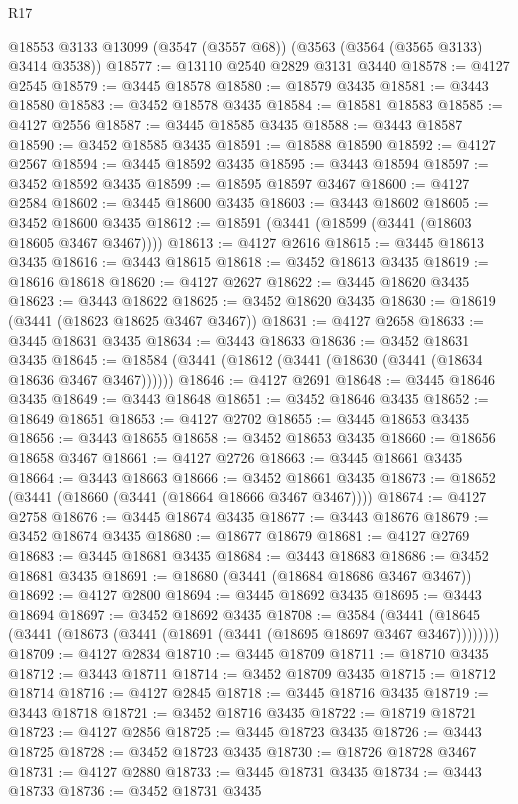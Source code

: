 \begin{lexlean}{R17}
\begin{coremodule}
    @18553
    @3133
    @13099
    (@3547 (@3557 @68))
    (@3563 (@3564 (@3565 @3133) @3414 @3538))
@18577 := @13110 @2540 @2829 @3131 @3440
@18578 := @4127 @2545
@18579 := @3445 @18578
@18580 := @18579 @3435
@18581 := @3443 @18580
@18583 := @3452 @18578 @3435
@18584 := @18581 @18583
@18585 := @4127 @2556
@18587 := @3445 @18585 @3435
@18588 := @3443 @18587
@18590 := @3452 @18585 @3435
@18591 := @18588 @18590
@18592 := @4127 @2567
@18594 := @3445 @18592 @3435
@18595 := @3443 @18594
@18597 := @3452 @18592 @3435
@18599 := @18595 @18597 @3467
@18600 := @4127 @2584
@18602 := @3445 @18600 @3435
@18603 := @3443 @18602
@18605 := @3452 @18600 @3435
@18612 := @18591 (@3441 (@18599 (@3441 (@18603 @18605 @3467 @3467))))
@18613 := @4127 @2616
@18615 := @3445 @18613 @3435
@18616 := @3443 @18615
@18618 := @3452 @18613 @3435
@18619 := @18616 @18618
@18620 := @4127 @2627
@18622 := @3445 @18620 @3435
@18623 := @3443 @18622
@18625 := @3452 @18620 @3435
@18630 := @18619 (@3441 (@18623 @18625 @3467 @3467))
@18631 := @4127 @2658
@18633 := @3445 @18631 @3435
@18634 := @3443 @18633
@18636 := @3452 @18631 @3435
@18645 := @18584 (@3441 (@18612 (@3441 (@18630 (@3441 (@18634 @18636 @3467 @3467))))))
@18646 := @4127 @2691
@18648 := @3445 @18646 @3435
@18649 := @3443 @18648
@18651 := @3452 @18646 @3435
@18652 := @18649 @18651
@18653 := @4127 @2702
@18655 := @3445 @18653 @3435
@18656 := @3443 @18655
@18658 := @3452 @18653 @3435
@18660 := @18656 @18658 @3467
@18661 := @4127 @2726
@18663 := @3445 @18661 @3435
@18664 := @3443 @18663
@18666 := @3452 @18661 @3435
@18673 := @18652 (@3441 (@18660 (@3441 (@18664 @18666 @3467 @3467))))
@18674 := @4127 @2758
@18676 := @3445 @18674 @3435
@18677 := @3443 @18676
@18679 := @3452 @18674 @3435
@18680 := @18677 @18679
@18681 := @4127 @2769
@18683 := @3445 @18681 @3435
@18684 := @3443 @18683
@18686 := @3452 @18681 @3435
@18691 := @18680 (@3441 (@18684 @18686 @3467 @3467))
@18692 := @4127 @2800
@18694 := @3445 @18692 @3435
@18695 := @3443 @18694
@18697 := @3452 @18692 @3435
@18708 := @3584
    (@3441 (@18645 (@3441 (@18673 (@3441 (@18691 (@3441 (@18695 @18697 @3467 @3467))))))))
@18709 := @4127 @2834
@18710 := @3445 @18709
@18711 := @18710 @3435
@18712 := @3443 @18711
@18714 := @3452 @18709 @3435
@18715 := @18712 @18714
@18716 := @4127 @2845
@18718 := @3445 @18716 @3435
@18719 := @3443 @18718
@18721 := @3452 @18716 @3435
@18722 := @18719 @18721
@18723 := @4127 @2856
@18725 := @3445 @18723 @3435
@18726 := @3443 @18725
@18728 := @3452 @18723 @3435
@18730 := @18726 @18728 @3467
@18731 := @4127 @2880
@18733 := @3445 @18731 @3435
@18734 := @3443 @18733
@18736 := @3452 @18731 @3435

\end{coremodule}
\end{lexlean}

